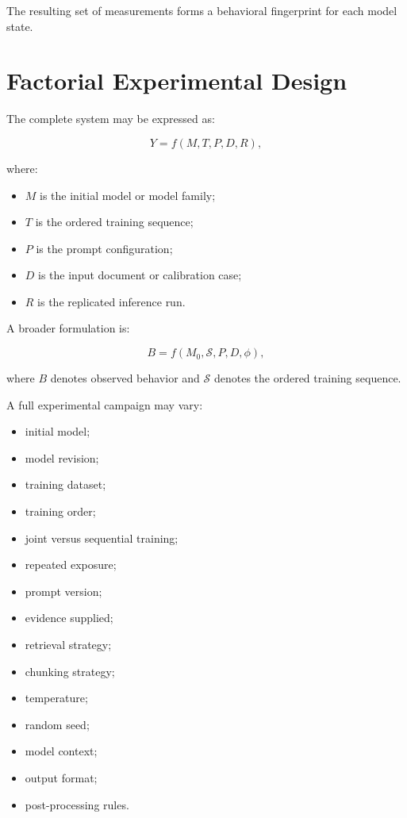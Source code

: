 \documentclass[11pt]{report}
\begin{document}
The resulting set of measurements forms a behavioral fingerprint for each model state.

\chapter{Factorial Experimental Design}

The complete system may be expressed as:

\[
Y=f(M,T,P,D,R),
\]

where:

\begin{itemize}
  \item $M$ is the initial model or model family;
  \item $T$ is the ordered training sequence;
  \item $P$ is the prompt configuration;
  \item $D$ is the input document or calibration case;
  \item $R$ is the replicated inference run.
\end{itemize}

A broader formulation is:

\[
B=f(M_0,\mathcal{S},P,D,\phi),
\]

where $B$ denotes observed behavior and $\mathcal{S}$ denotes the ordered training sequence.

A full experimental campaign may vary:

\begin{itemize}
  \item initial model;
  \item model revision;
  \item training dataset;
  \item training order;
  \item joint versus sequential training;
  \item repeated exposure;
  \item prompt version;
  \item evidence supplied;
  \item retrieval strategy;
  \item chunking strategy;
  \item temperature;
  \item random seed;
  \item model context;
  \item output format;
  \item post-processing rules.
\end{itemize}
\end{document}

